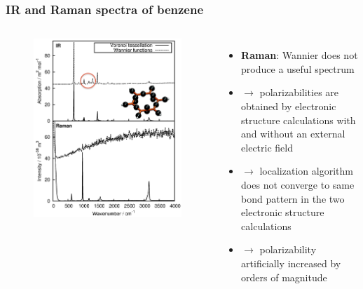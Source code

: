 \documentclass[t]{beamer}
\begin{document}
\begin{frame}
	\frametitle{IR and Raman spectra of benzene}
	\vspace{-.6cm}
	\begin{columns}
		\begin{figure}
			\vspace{-.6cm}
			\includegraphics[width=1.1\textwidth]{figures/benzene_spectra2.png}
		\end{figure}
		\begin{itemize}
			\item \textbf{Raman}: Wannier does not produce a useful spectrum
			\item[]
			      $\rightarrow$ polarizabilities are obtained by electronic structure calculations with and without an external electric field
			\item[]
			      $\rightarrow$ localization algorithm does not converge to same bond pattern in the two electronic structure calculations
			\item[]
			      $\rightarrow$ polarizability artificially increased by orders of magnitude
		\end{itemize}
	\end{columns}
\end{frame}
\end{document}
